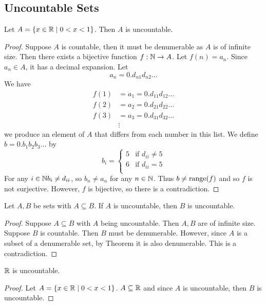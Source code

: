 \documentclass{article}
\begin{document}
    \subsection{Uncountable Sets}
    \begin{theorem}
      Let $A = \{x \in \mathbb{R} \mid 0 < x < 1 \}$. Then $A$ is uncountable.
    \end{theorem}
    \begin{proof}
      Suppose $A$ is countable, then it must be denumerable as $A$ is of infinite size. Then there exists a bijective function $f: \mathbb{N} \to A$. Let $f(n) = a_n$.
      Since $a_n \in A$, it has a decimal expansion.
      Let \[
        a_n = 0.d_{n1}d_{n2}\ldots
      \]
      We have
      \begin{align*}
        f(1) &= a_1 = 0.d_{11}d_{12}\ldots\\
        f(2) &= a_2 = 0.d_{21}d_{22}\ldots\\
        f(3) &= a_3 = 0.d_{31}d_{32}\ldots\\
        &\vdots
      \end{align*}
      we produce an element of $A$ that differs from each number in this list. We define $b = 0.b_1b_2b_3\ldots$ by \[
        b_i =
        \begin{cases}
          5 &\text{if }d_{ii}\neq 5\\
          6 &\text{if }d_{ii} = 5\\
        \end{cases}
      \]
      For any $i \in \mathbb{N} b_i \neq d_{ii}$, so $b_n \neq a_n$ for any $n \in \mathbb{N}$. Thus $b \neq \operatorname{\text{range}}(f)$ and so $f$ is not surjective. However, $f$ is bijective, so there is a contradiction.
    \end{proof}
    \begin{theorem}
      Let $A, B$ be sets with $A \subseteq B$. If $A$ is uncountable, then $B$ is uncountable.
    \end{theorem}
    \begin{proof}
      Suppose $A \subseteq B$ with $A$ being uncountable. Then $A, B$ are of infinite size. Suppose $B$ is countable. Then $B$ must be denumerable. However, since $A$ is a subset of a denumerable set, by Theorem it is also denumerable. This is a contradiction.
    \end{proof}
    \begin{theorem}
      $\mathbb{R}$ is uncountable.
    \end{theorem}
    \begin{proof}
      Let $A = \{x \in \mathbb{R} \mid 0 < x < 1\}$. $A \subseteq \mathbb{R}$ and since $A$ is uncountable, then $B$ is uncountable.
    \end{proof}
\end{document}
